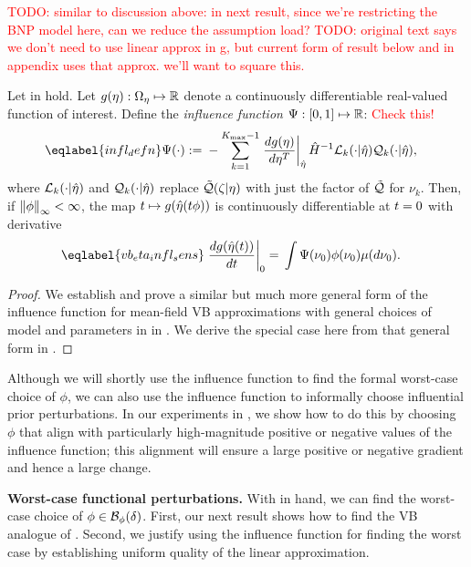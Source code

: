 \textcolor{red}{TODO: similar to discussion above: in next result, since we're restricting the BNP model here, can we reduce the assumption load?}
\textcolor{red}{TODO: original text says we don't need to use linear approx in g, but current form of result below and in appendix uses that approx. we'll want to square this.}
\begin{cor}
%
Let  in  hold. Let $g(\eta): \Omega_{\eta} \mapsto \mathbb{R}$ denote a
continuously differentiable real-valued function of interest.  Define the
\emph{influence function} $\Psi: [0,1] \mapsto \mathbb{R}$: \textcolor{red}{Check this!}
%
\begin{align} \eqlabel{infl_defn}
%
\infl(\cdot) :={}&
    - \sum_{k=1}^{\kmax-1} \fracat{d g(\eta)}{ d \eta^T}{\etaopt} \hessopt^{-1}
        \lqgradbark{\cdot \vert \etaopt}
        \qk(\cdot \vert \etaopt),
%
\end{align}
where $\mathcal{L}_k({\cdot \vert \hat\eta})$ and $\mathcal{Q}_k(\cdot \vert \hat\eta)$
replace $\tilde{\mathcal{Q}}(\zeta \vert \eta)$ with just the factor of $\tilde{\mathcal{Q}}$ for $\nu_k$.
%
Then, if $\left\Vert\phi\right\Vert_{\infty} < \infty$, the map $t \mapsto g(\hat\eta(t \phi))$ is
continuously differentiable at $t=0$ with derivative
%
\begin{align} \eqlabel{vb_eta_infl_sens}
%
\fracat{d g(\etaopt(\t))}{d \t}{0} ={}&
    \int \infl(\nu_0) \phi(\nu_0) \mu(d\nu_0).
%
\end{align}
\end{cor}
%
\begin{proof}
We establish and prove a similar but much more general form of the influence function for mean-field VB approximations with general choices of model and parameters in  in . We derive the special case here from that general form in .
\end{proof}

Although we will shortly use the influence function to find the formal worst-case choice of $\phi$, we
can also use the influence function to informally choose influential prior perturbations. In our experiments
in , we show how to do this by choosing $\phi$ that align with particularly high-magnitude positive or negative values of the influence function; this alignment will ensure a large positive or negative gradient and hence a large change.

\noindent \textbf{Worst-case functional perturbations.}
%
With  in hand, we can find the worst-case choice of $\phi \in \mathcal{B}_\phi(\delta)$.
First, our next result shows how to find the VB analogue of \citet[Result
11]{gustafson:1996:local}. Second, we justify using the influence function for finding the worst case
by establishing uniform quality of the linear approximation.

